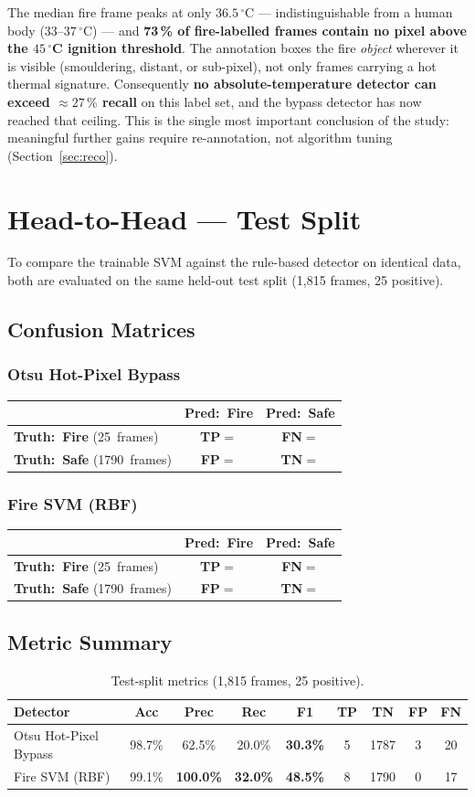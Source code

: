 \documentclass[11pt, a4paper]{article}
\newcommand{\confmat}[6]{%
    \def\cmTP{#1}\def\cmFN{#2}\def\cmFP{#3}\def\cmTN{#4}%
    \def\cmPos{#5}\def\cmNeg{#6}%
    \vspace{4pt}
    \begin{center}
    \renewcommand{\arraystretch}{1.8}%
    \begin{tabular}{lcc}
        \hline
        \rule{0pt}{2.4ex}%
        & \textbf{Pred:\ Fire} & \textbf{Pred:\ Safe} \\[2pt]
        \hline
        \rule{0pt}{2.6ex}%
        \textbf{Truth:\ Fire} (\cmPos\ frames)
            & \cellcolor{cellgreenlight}\textcolor{tpgreen}{\textbf{TP}}\;$=$\;\cmTP
            & \cellcolor{cellyellowlight}\textcolor{fnyellow}{\textbf{FN}}\;$=$\;\cmFN \\[4pt]
        \textbf{Truth:\ Safe} (\cmNeg\ frames)
            & \cellcolor{cellredlight}\textcolor{fpred}{\textbf{FP}}\;$=$\;\cmFP
            & \cellcolor{cellbluelight}\textcolor{tnblue}{\textbf{TN}}\;$=$\;\cmTN \\[2pt]
        \hline
    \end{tabular}
    \end{center}
    \vspace{4pt}
}
\begin{document}
The median fire frame peaks at only $36.5\,^\circ$C — indistinguishable from a human body
($33$--$37\,^\circ$C) — and \textbf{73\,\% of fire-labelled frames contain no pixel above
the $45\,^\circ$C ignition threshold}.  The annotation boxes the fire \emph{object}
wherever it is visible (smouldering, distant, or sub-pixel), not only frames carrying a
hot thermal signature.  Consequently \textbf{no absolute-temperature detector can exceed
$\approx27\,\%$ recall} on this label set, and the bypass detector has now reached that
ceiling.  This is the single most important conclusion of the study: meaningful further
gains require re-annotation, not algorithm tuning (Section~\ref{sec:reco}).

\section{Head-to-Head — Test Split}\label{sec:headtohead}

To compare the trainable SVM against the rule-based detector on identical data, both are
evaluated on the same held-out test split (1{,}815 frames, 25 positive).

\subsection{Confusion Matrices}

\subsubsection*{Otsu Hot-Pixel Bypass}
\confmat{5}{20}{3}{1787}{25}{1790}

\subsubsection*{Fire SVM (RBF)}
\confmat{8}{17}{0}{1790}{25}{1790}

\subsection{Metric Summary}

\begin{table}[H]
\centering
\caption{Test-split metrics (1{,}815 frames, 25 positive).}
\renewcommand{\arraystretch}{1.3}
\begin{tabular}{lcccccccc}
\toprule
\textbf{Detector}
    & \textbf{Acc} & \textbf{Prec} & \textbf{Rec} & \textbf{F1}
    & \textbf{TP}  & \textbf{TN}   & \textbf{FP}  & \textbf{FN} \\
\midrule
Otsu Hot-Pixel Bypass
    & 98.7\% & 62.5\% & 20.0\% & \textbf{30.3\%}
    & 5 & 1787 & 3 & 20 \\
Fire SVM (RBF)
    & 99.1\% & \textbf{100.0\%} & \textbf{32.0\%} & \textbf{48.5\%}
    & 8 & 1790 & 0 & 17 \\
\bottomrule
\end{tabular}
\label{tab:headtohead}
\end{table}
\end{document}
